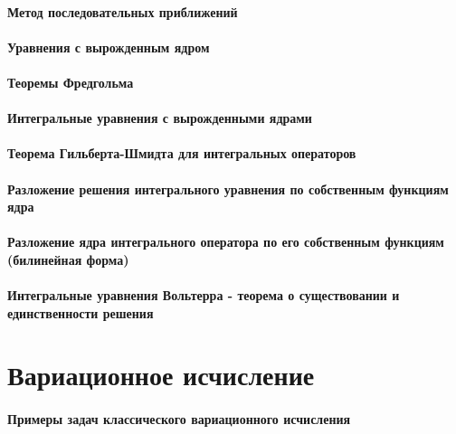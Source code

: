 \documentclass[russian,twocolumn]{article}
\begin{document}
\paragraph{Метод последовательных приближений}

\paragraph{Уравнения с вырожденным ядром}

\paragraph{Теоремы Фредгольма}

\paragraph{Интегральные уравнения с вырожденными ядрами}

\paragraph{Теорема Гильберта-Шмидта для интегральных операторов}

\paragraph{Разложение решения интегрального уравнения по собственным функциям ядра}

\paragraph{Разложение ядра интегрального оператора по его собственным функциям (билинейная форма)}

\paragraph{Интегральные уравнения Вольтерра - теорема о существовании и единственности решения}

\section{Вариационное исчисление}

\paragraph{Примеры задач классического вариационного исчисления}
\end{document}

